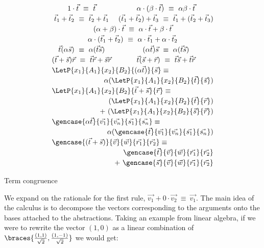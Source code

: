 \begin{table*}[tb]
  \[\renewcommand*{\arraystretch}{1.2}
    \begin{array}{c c}
      1\cdot\vec{t}~\equiv~\vec{t}&
      \alpha\cdot(\beta\cdot\vec{t})~\equiv~\alpha\beta\cdot\vec{t}\\
      \vec{t}_1+\vec{t}_2 ~\equiv~\vec{t}_2+\vec{t}_1 &
      (\vec{t}_1+\vec{t}_2)+\vec{t}_3~\equiv~\vec{t}_1+(\vec{t}_2+\vec{t}_3)\\
      \multicolumn{2}{c}{(\alpha+\beta)\cdot\vec{t}~\equiv~\alpha\cdot\vec{t}+\beta\cdot\vec{t}}\\
      \multicolumn{2}{c}{\alpha\cdot(\vec{t}_1+\vec{t}_2)~\equiv~\alpha\cdot\vec{t}_1+\alpha\cdot\vec{t}_2}\\
      \vec t (\alpha \vec s)~\equiv~ \alpha (\vec{t}\vec{s})&
      (\alpha \vec t) \vec s ~\equiv~ \alpha (\vec{t}\vec{s})\\
      (\vec t + \vec s) \vec{r}~\equiv~\vec{t}\vec{r} + \vec{s}\vec{r} &
      \vec t(\vec{s}+\vec{r})~\equiv~\vec{t}\vec{s} + \vec{t}\vec{r}\\
      \multicolumn{2}{l}{\LetP{x_1}{A_1}{x_2}{B_2}{(\alpha\vec{t})}{\vec{s}}\equiv}\\
      \multicolumn{2}{r}{\alpha(\LetP{x_1}{A_1}{x_2}{B_2}{\vec{t}}{\vec{s}})}\\
      \multicolumn{2}{l}{\LetP{x_1}{A_1}{x_2}{B_2}{\vec{t}+\vec{s}}{\vec{r}}\equiv}\\
      \multicolumn{2}{r}{(\LetP{x_1}{A_1}{x_2}{B_2}{\vec{t}}{\vec{r}})}\\
      \multicolumn{2}{r}{+~(\LetP{x_1}{A_1}{x_2}{B_2}{\vec{s}}{\vec{r}})}\\
      \multicolumn{2}{l}{\gencase{\alpha \vec{t}}{\vec{v_1}}{\vec{v_n}}{\vec{s_1}}{\vec{s_n}}\equiv}\\
      \multicolumn{2}{r}{\alpha(\gencase{\vec{t}}{\vec{v_1}}{\vec{v_n}}{\vec{s_1}}{\vec{s_n}})}\\
      \multicolumn{2}{l}{\gencase{(\vec{t}+\vec{s})}{\vec{v}}{\vec{w}}{\vec{r_1}}{\vec{r_2}}\equiv}\\
      \multicolumn{2}{r}{\gencase{\vec{t}}{\vec{v}}{\vec{w}}{\vec{r_1}}{\vec{r_2}}}\\
      \multicolumn{2}{r}{+~\gencase{\vec{s}}{\vec{v}}{\vec{w}}{\vec{r_1}}{\vec{r_2}}}
    \end{array}
  \]
  \caption{Term congruence}
  \label{tab:Congruence}
\end{table*}


We expand on the rationale for the first rule, $\vec{v_1} + 0\cdot \vec{v_2}~\equiv~\vec{v_1}$. The main idea of the calculus is to decompose the vectors corresponding to the arguments onto the bases attached to the abstractions. Taking an example from linear algebra, if we were to rewrite the vector $(1,0)$ as a linear combination of $\braces{\frac{(1,1)}{\sqrt{2}}, \frac{(1,-1)}{\sqrt{2}}}$ we would get:

